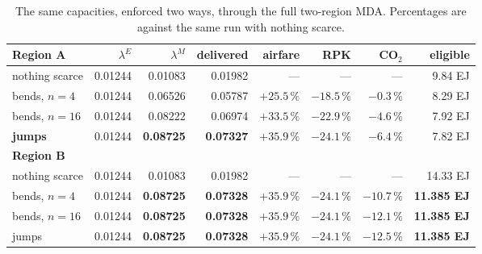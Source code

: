 \documentclass[11pt,a4paper]{article}
\begin{document}
\begin{table}[h]
\centering\small
\begin{tabular}{@{}lrrrrrrr@{}}
\toprule
\textbf{Region A} & $\lambda^{E}$ & $\lambda^{M}$ & \textbf{delivered} &
  \textbf{airfare} & \textbf{RPK} & \textbf{CO$_2$} & \textbf{eligible} \\
\midrule
nothing scarce & 0.01244 & 0.01083 & 0.01982 & --- & --- & --- & 9.84 EJ \\
bends, $n=4$ & 0.01244 & 0.06526 & 0.05787 & $+25.5\,\%$ & $-18.5\,\%$ & $-0.3\,\%$ & 8.29 EJ \\
bends, $n=16$ & 0.01244 & 0.08222 & 0.06974 & $+33.5\,\%$ & $-22.9\,\%$ & $-4.6\,\%$ & 7.92 EJ \\
\textbf{jumps} & 0.01244 & \textbf{0.08725} & \textbf{0.07327} & $\mathbf{+35.9\,\%}$ &
  $\mathbf{-24.1\,\%}$ & $-6.4\,\%$ & 7.82 EJ \\
\midrule
\textbf{Region B} & & & & & & & \\
\midrule
nothing scarce & 0.01244 & 0.01083 & 0.01982 & --- & --- & --- & 14.33 EJ \\
bends, $n=4$ & 0.01244 & \textbf{0.08725} & \textbf{0.07328} & $+35.9\,\%$ & $-24.1\,\%$ & $-10.7\,\%$ & \textbf{11.385 EJ} \\
bends, $n=16$ & 0.01244 & \textbf{0.08725} & \textbf{0.07328} & $+35.9\,\%$ & $-24.1\,\%$ & $-12.1\,\%$ & \textbf{11.385 EJ} \\
jumps & 0.01244 & \textbf{0.08725} & \textbf{0.07328} & $+35.9\,\%$ & $-24.1\,\%$ & $-12.5\,\%$ & \textbf{11.385 EJ} \\
\bottomrule
\end{tabular}
\caption{The same capacities, enforced two ways, through the full two-region MDA.
Percentages are against the same run with nothing scarce.}
\label{tab:five}
\end{table}
\end{document}
